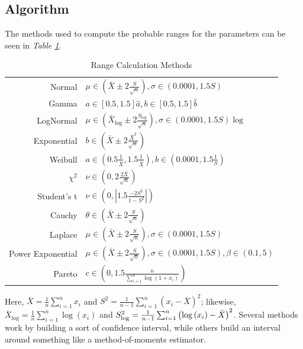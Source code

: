 \documentclass{book}
\begin{document}
\subsection*{Algorithm}

The methods used to compute the probable ranges for the parameters
can be seen in \emph{Table \ref{tab_rngmeth}}.
\begin{table}[htbp]
\begin{center}
\begin{tabular}{rl}
Normal & $\mu \in \left( \bar{X}\pm 2\frac{S}{\sqrt{n}}\right) ,\sigma \in
\left( 0.0001,1.5S\right) $ \\
Gamma & $a\in \left[ 0.5,1.5\right] \hat{a},b\in \left[ 0.5,1.5\right] \hat{b}$ \\
LogNormal & $\mu \in \left( \bar{X}_{\log }\pm 2\frac{S_{\log }}{\sqrt{n}}%
\right) ,\sigma \in \left( 0.0001,1.5S\right) \log $ \\
Exponential & $b\in \left( \bar{X}\pm 2\frac{\bar{X}^{2}}{\sqrt{n}}\right) $
\\
Weibull & $a\in \left( 0.5\frac{1}{\bar{X}},1.5\frac{1}{\bar{X}}\right)
,b\in \left( 0.0001,1.5\frac{1}{S}\right) $ \\
$\chi ^{2}$ & $\nu \in \left( 0,2\frac{2\bar{X}}{\sqrt{n}}\right) $ \\
Student's t & $\nu \in \left( 0,\left\vert 1.5\frac{-2S^{2}}{1-S^{2}}%
\right\vert \right) $ \\
Cauchy & $\theta \in \left( \bar{X}\pm 2\frac{S}{\sqrt{n}}\right) $ \\
Laplace & $\mu \in \left( \bar{X}\pm 2\frac{S}{\sqrt{n}}\right) ,\sigma \in
\left( 0.0001,1.5S\right) $ \\
Power Exponential & $\mu \in \left( \bar{X}\pm 2\frac{S}{\sqrt{n}}\right)
,\sigma \in \left( 0.0001,1.5S\right) ,\beta \in \left( 0.1,5\right) $ \\
Pareto & $c\in \left( 0,1.5\frac{n}{\sum_{i=1}^{n}\log \left( 1+x_{i}\right)
}\right) $%
\end{tabular}%
\end{center}
\caption{Range Calculation Methods} \label{tab_rngmeth}
\end{table}
Here, $\bar{X}=\frac{1}{n}\sum_{i=1}^{n}x_{i}$ and $S^{2}=\frac{1}{n-1}%
\sum_{i=1}^{n}\left( x_{i}-\bar{X}\right) ^{2}$; likewise, $\bar{X}_{\log }=%
\frac{1}{n}\sum_{i=1}^{n}\log \left( x_{i}\right) $ and $S_{\log }^{2}=\frac{%
1}{n-1}\sum_{i=1}^{n}\left( \log \left( x_{i}\right) -\bar{X}\right)
^{2}$. Several methods work by building a sort of confidence
interval, while others build an interval around something like a
method-of-moments estimator.
\end{document}
